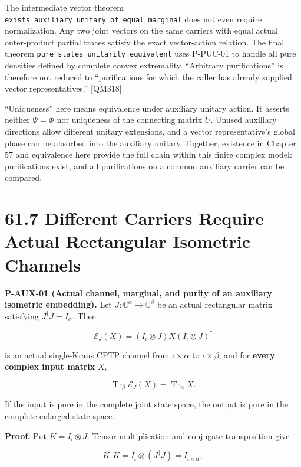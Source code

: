 \documentclass[
  11pt,
  oneside]{book}
\begin{document}
The intermediate vector theorem
\texttt{exists\_\allowbreak auxiliary\_\allowbreak unitary\_\allowbreak of\_\allowbreak equal\_\allowbreak marginal} does not even
require normalization. Any two joint vectors on the same carriers with
equal actual outer-product partial traces satisfy the exact
vector-action relation. The final theorem
\texttt{pure\_\allowbreak states\_\allowbreak unitarily\_\allowbreak equivalent} uses P-PUC-01 to handle all
pure densities defined by complete convex extremality. ``Arbitrary
purifications'' is therefore not reduced to ``purifications for which
the caller has already supplied vector representatives.'' {[}QM318{]}

``Uniqueness'' here means equivalence under auxiliary unitary action. It
asserts neither \(\Psi=\Phi\) nor uniqueness of the connecting matrix
\(U\). Unused auxiliary directions allow different unitary extensions,
and a vector representative's global phase can be absorbed into the
auxiliary unitary. Together, existence in Chapter 57 and equivalence
here provide the full chain within this finite complex model:
purifications exist, and all purifications on a common auxiliary carrier
can be compared.

\section{61.7 Different Carriers Require Actual Rectangular Isometric
Channels}

\label{p-aux-01}{}

\textbf{P-AUX-01 (Actual channel, marginal, and purity of an auxiliary
isometric embedding).} Let \(J:\mathbb C^\alpha\to\mathbb C^\beta\) be
an actual rectangular matrix satisfying \(J^\dagger J=I_\alpha\). Then

\[
\mathcal E_J(X)=(I_\iota\otimes J)X(I_\iota\otimes J)^\dagger
\]

is an actual single-Kraus CPTP channel from \(\iota\times\alpha\) to
\(\iota\times\beta\), and for \textbf{every complex input matrix} \(X\),

\[
\operatorname{Tr}_\beta\mathcal E_J(X)
=\operatorname{Tr}_\alpha X.
\]

If the input is pure in the complete joint state space, the output is
pure in the complete enlarged state space.

\textbf{Proof.} Put \(K=I_\iota\otimes J\). Tensor multiplication and
conjugate transposition give

\[
K^\dagger K=I_\iota\otimes(J^\dagger J)
=I_{\iota\times\alpha},
\]
\end{document}
